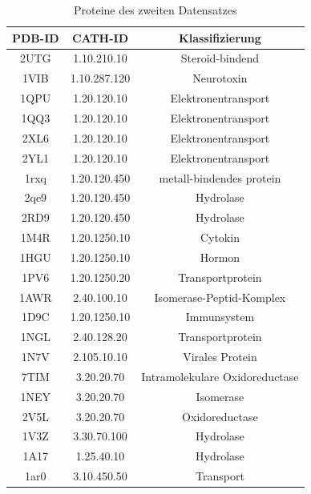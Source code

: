 \documentclass{report}
\begin{document}
\begin{table}[h!]
\label{tab:set2}
\begin{tabular}{ | c || c | c | }
\hline
PDB-ID & CATH-ID & Klassifizierung \\ \hline
2UTG & 1.10.210.10 & Steroid-bindend  \\ \hline %
1VIB & 1.10.287.120 & Neurotoxin \\ \hline %
1QPU & 1.20.120.10 & Elektronentransport  \\ \hline %
1QQ3 & 1.20.120.10 & Elektronentransport \\ \hline %
2XL6 & 1.20.120.10 & Elektronentransport \\ \hline %
2YL1 & 1.20.120.10 & Elektronentransport\\ \hline%
1rxq & 1.20.120.450 & metall-bindendes protein \\ \hline
2qe9 & 1.20.120.450 & Hydrolase \\ \hline%
2RD9 & 1.20.120.450 & Hydrolase \\ \hline%
1M4R & 1.20.1250.10 & Cytokin \\ \hline%
1HGU & 1.20.1250.10 & Hormon \\ \hline%
1PV6 & 1.20.1250.20 & Transportprotein \\ \hline%
1AWR & 2.40.100.10 &  Isomerase-Peptid-Komplex \\ \hline%
1D9C & 1.20.1250.10 & Immunsystem \\ \hline%
1NGL & 2.40.128.20 & Transportprotein \\ \hline%
1N7V & 2.105.10.10 &  Virales Protein \\ \hline%
7TIM & 3.20.20.70 & Intramolekulare Oxidoreductase \\ \hline%
1NEY & 3.20.20.70 & Isomerase  \\ \hline%
2V5L & 3.20.20.70 & Oxidoreductase  \\ \hline%
1V3Z & 3.30.70.100 & Hydrolase \\ \hline%
1A17 & 1.25.40.10  & Hydrolase \\ \hline%
1ar0 & 3.10.450.50 & Transport  \\ \hline
\end{tabular}
\caption{Proteine des zweiten Datensatzes}
\end{table}
\end{document}

